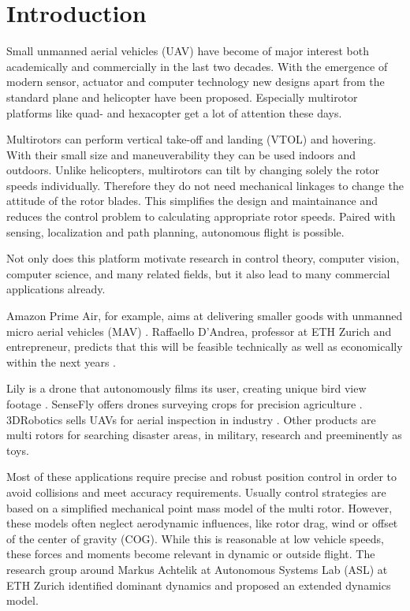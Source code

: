 \chapter{Introduction}
\label{sec:introduction}

 Small unmanned aerial vehicles (UAV) have become of major interest both academically and commercially in the last two decades. With the emergence of modern sensor, actuator and computer technology new designs apart from the standard plane and helicopter have been proposed.  Especially multirotor platforms like quad- and hexacopter get a lot of attention these days.

 Multirotors can perform vertical take-off and landing (VTOL) and hovering. With their small size and maneuverability they can be used indoors and outdoors. Unlike helicopters, multirotors can tilt by changing solely the rotor speeds individually. Therefore they do not need mechanical linkages to change the attitude of the rotor blades. This simplifies the design and maintainance and reduces the control problem to calculating appropriate rotor speeds. Paired with sensing, localization and path planning, autonomous flight is possible. 

 Not only does this platform motivate research in control theory, computer vision, computer science, and many related fields, but it also lead to many commercial applications already. 

Amazon Prime Air, for example, aims at delivering smaller goods with unmanned micro aerial vehicles (MAV) \cite{www:primeair}. Raffaello D'Andrea, professor at ETH Zurich and entrepreneur, predicts that this will be feasible technically as well as economically within the next years \cite{DAndrea2014}. 

Lily is a drone that autonomously films its user, creating unique bird view footage \cite{www:lily}. SenseFly offers drones surveying crops for precision agriculture \cite{www:sensefly}. 3DRobotics sells UAVs for aerial inspection in industry \cite{www:3drobotics}. Other products are multi rotors for searching disaster areas, in military, research and preeminently as toys.

Most of these applications require precise and robust position control in order to avoid collisions and meet accuracy requirements. Usually control strategies are based on a simplified mechanical point mass model of the multi rotor. However, these models often neglect aerodynamic influences, like rotor drag, wind or offset of the center of gravity (COG). While this is reasonable at low vehicle speeds, these forces and moments become relevant in dynamic or outside flight. The research group around Markus Achtelik at Autonomous Systems Lab (ASL) at ETH Zurich identified dominant dynamics and proposed an extended dynamics model. 

